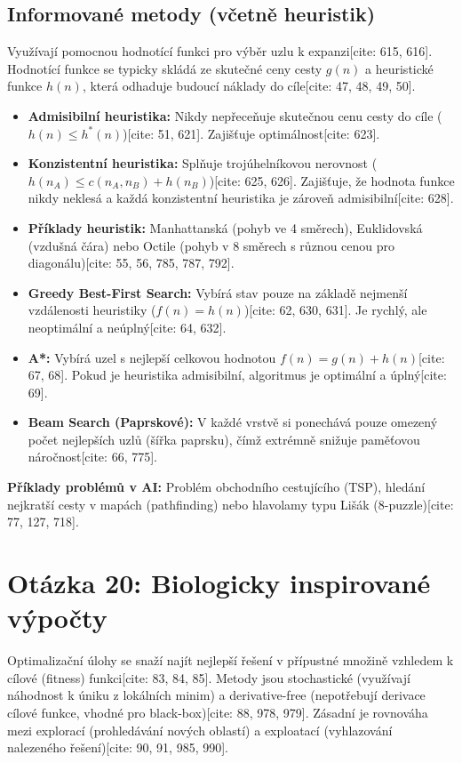 \documentclass{article}
\begin{document}
\subsection{Informované metody (včetně heuristik)}
Využívají pomocnou hodnotící funkci pro výběr uzlu k expanzi[cite: 615, 616]. Hodnotící funkce se typicky skládá ze skutečné ceny cesty $g(n)$ a heuristické funkce $h(n)$, která odhaduje budoucí náklady do cíle[cite: 47, 48, 49, 50]. 
\begin{itemize}
    \item \textbf{Admisibilní heuristika:} Nikdy nepřeceňuje skutečnou cenu cesty do cíle ($h(n) \le h^*(n)$)[cite: 51, 621]. Zajišťuje optimálnost[cite: 623].
    \item \textbf{Konzistentní heuristika:} Splňuje trojúhelníkovou nerovnost ($h(n_A) \le c(n_A,n_B) + h(n_B)$)[cite: 625, 626]. Zajišťuje, že hodnota funkce nikdy neklesá a každá konzistentní heuristika je zároveň admisibilní[cite: 628].
    \item \textbf{Příklady heuristik:} Manhattanská (pohyb ve 4 směrech), Euklidovská (vzdušná čára) nebo Octile (pohyb v 8 směrech s různou cenou pro diagonálu)[cite: 55, 56, 785, 787, 792].
    \item \textbf{Greedy Best-First Search:} Vybírá stav pouze na základě nejmenší vzdálenosti heuristiky ($f(n) = h(n)$)[cite: 62, 630, 631]. Je rychlý, ale neoptimální a neúplný[cite: 64, 632].
    \item \textbf{A*:} Vybírá uzel s nejlepší celkovou hodnotou $f(n) = g(n) + h(n)$[cite: 67, 68]. Pokud je heuristika admisibilní, algoritmus je optimální a úplný[cite: 69].
    \item \textbf{Beam Search (Paprskové):} V každé vrstvě si ponechává pouze omezený počet nejlepších uzlů (šířka paprsku), čímž extrémně snižuje paměťovou náročnost[cite: 66, 775].
\end{itemize}
\textbf{Příklady problémů v AI:} Problém obchodního cestujícího (TSP), hledání nejkratší cesty v mapách (pathfinding) nebo hlavolamy typu Lišák (8-puzzle)[cite: 77, 127, 718].

\newpage

\section{Otázka 20: Biologicky inspirované výpočty}

Optimalizační úlohy se snaží najít nejlepší řešení v přípustné množině vzhledem k cílové (fitness) funkci[cite: 83, 84, 85]. Metody jsou stochastické (využívají náhodnost k úniku z lokálních minim) a derivative-free (nepotřebují derivace cílové funkce, vhodné pro black-box)[cite: 88, 978, 979]. Zásadní je rovnováha mezi explorací (prohledávání nových oblastí) a exploatací (vyhlazování nalezeného řešení)[cite: 90, 91, 985, 990].
\end{document}
